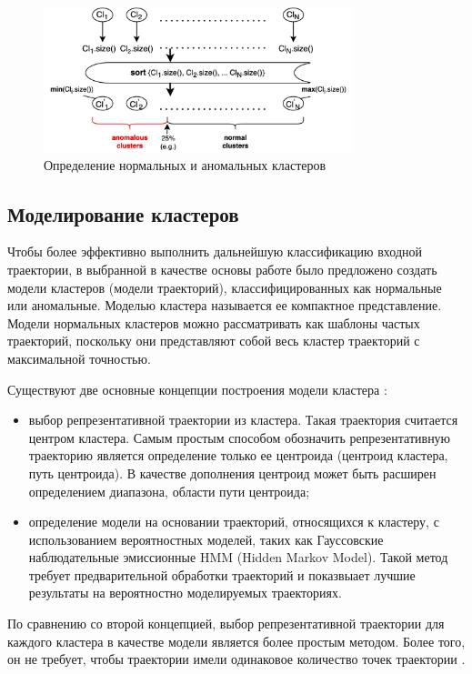 \begin{figure}[!htb]
	\centering{}
	\includegraphics[width=0.8\textwidth]{images/cl-classif.png}
	\caption{Определение нормальных и аномальных кластеров}
	\label{fig:cl-classif}
\end{figure}

\subsection{Моделирование кластеров}

Чтобы более эффективно выполнить дальнейшую классификацию входной траектории, в выбранной в качестве основы работе было предложено создать модели кластеров (модели траекторий), классифицированных как нормальные или аномальные. Моделью кластера называется ее компактное представление. Модели нормальных кластеров можно рассматривать как шаблоны частых траекторий, поскольку они представляют собой весь кластер траекторий с максимальной точностью.

Существуют две основные концепции построения модели кластера \cite{article:surv_cl_models}:
\begin{itemize}
	\item выбор репрезентативной траектории из кластера. Такая траектория считается центром кластера. Самым простым способом обозначить репрезентативную траекторию является определение только ее центроида (центроид кластера, путь центроида). В качестве дополнения центроид может быть расширен определением диапазона, области пути центроида;
	\item определение модели на основании траекторий, относящихся к кластеру, с использованием вероятностных моделей, таких как Гауссовские наблюдательные эмиссионные HMM (Hidden Markov Model). Такой метод требует предварительной обработки траекторий и показвыает лучшие результаты на вероятностно моделируемых траекториях.
\end{itemize}

По сравнению со второй концепцией, выбор репрезентативной траектории для каждого кластера в качестве модели является более простым методом. Более того, он не требует, чтобы траектории имели одинаковое количество точек траектории \cite{inproceedings:7_related_work}.

